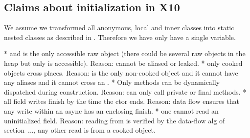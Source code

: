 \subsection{Claims about initialization in X10}
We assume we transformed all anonymous, local and inner classes into static nested classes
    as described in .
Therefore we have only have a single \this variable.


* \this and  is the only accessible raw object (there could be several raw objects in the heap but only \this is accessible). Reason: \this cannot be aliased or leaked.
* only cooked objects cross places. Reason: \this is the only non-cooked object and it cannot have any aliases and it cannot cross an .
* Only  methods can be dynamically dispatched during construction. Reason: can only call private or final methods.
* all field writes finish by the time the ctor ends. Reason: data flow ensures that any write within an async has an enclosing finish.
* one cannot read an uninitialized field. Reason: reading from \this is verified by the data-flow alg of section~..., any other read is from a cooked object.
